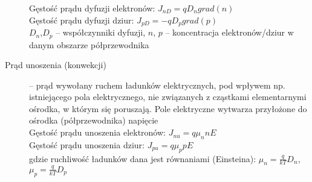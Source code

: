 \documentclass[a4paper,11pt]{article}
\begin{document}
\begin{description}
  Gęstość prądu dyfuzji elektronów: $J_{nD} = qD_ngrad(n)$\\
  Gęstość prądu dyfuzji dziur: $J_{pD} = -qD_pgrad(p)$\\
  $D_n$,$D_p$ -- współczynniki dyfuzji, $n$, $p$ -- koncentracja elektronów/dziur w danym obszarze półprzewodnika
\item[Prąd unoszenia (konwekcji)] -- prąd wywołany ruchem ładunków elektrycznych, pod wpływem np. istniejącego pola elektrycznego, nie związanych z cząstkami elementarnymi ośrodka, w którym się poruszają. Pole elektryczne wytwarza przyłożone do ośrodka (półprzewodnika) napięcie\\
  Gęstość prądu unoszenia elektronów: $J_{nu} = q\mu_nnE$\\
  Gęstość prądu unoszenia dziur: $J_{pu} = q\mu_ppE$\\
  gdzie ruchliwość ładunków dana jest równaniami (Einsteina):
  $\mu_n=\frac{q}{kT}D_n$, $\mu_p=\frac{q}{kT}D_p$
  

\end{description}
\end{document}
